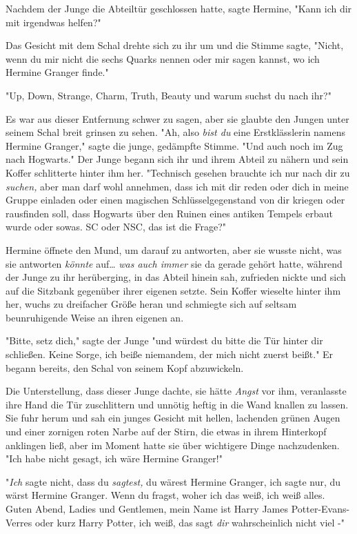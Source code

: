 {Nachdem der Junge die Abteiltür geschlossen hatte, sagte Hermine, "Kann ich dir mit irgendwas helfen?"

Das Gesicht mit dem Schal drehte sich zu ihr um und die Stimme sagte, "Nicht, wenn du mir nicht die sechs Quarks nennen oder mir sagen kannst, wo ich Hermine Granger finde."

"Up, Down, Strange, Charm, Truth, Beauty und warum suchst du nach ihr?"

Es war aus dieser Entfernung schwer zu sagen, aber sie glaubte den Jungen unter seinem Schal breit grinsen zu sehen. "Ah, also \emph{bist du} eine Erstklässlerin namens Hermine Granger," sagte die junge, gedämpfte Stimme. "Und auch noch im Zug nach Hogwarts." Der Junge begann sich ihr und ihrem Abteil zu nähern und sein Koffer schlitterte hinter ihm her. "Technisch gesehen brauchte ich nur nach dir zu \emph{suchen,} aber man darf wohl annehmen, dass ich mit dir reden oder dich in meine Gruppe einladen oder einen magischen Schlüsselgegenstand von dir kriegen oder rausfinden soll, dass Hogwarts über den Ruinen eines antiken Tempels erbaut wurde oder sowas. SC oder NSC, das ist die Frage?"

Hermine öffnete den Mund, um darauf zu antworten, aber sie wusste nicht, was sie antworten \emph{könnte} auf… \emph{was auch immer} sie da gerade gehört hatte, während der Junge zu ihr herüberging, in das Abteil hinein sah, zufrieden nickte und sich auf die Sitzbank gegenüber ihrer eigenen setzte. Sein Koffer wieselte hinter ihm her, wuchs zu dreifacher Größe heran und schmiegte sich auf seltsam beunruhigende Weise an ihren eigenen an.

"Bitte, setz dich," sagte der Junge "und würdest du bitte die Tür hinter dir schließen. Keine Sorge, ich beiße niemandem, der mich nicht zuerst beißt." Er begann bereits, den Schal von seinem Kopf abzuwickeln.

Die Unterstellung, dass dieser Junge dachte, sie hätte \emph{Angst} vor ihm, veranlasste ihre Hand die Tür zuschlittern und unnötig heftig in die Wand knallen zu lassen. Sie fuhr herum und sah ein junges Gesicht mit hellen, lachenden grünen Augen und einer zornigen roten Narbe auf der Stirn, die etwas in ihrem Hinterkopf anklingen ließ, aber im Moment hatte sie über wichtigere Dinge nachzudenken. "Ich habe nicht gesagt, ich wäre Hermine Granger!"

"\emph{Ich} sagte nicht, dass du \emph{sagtest,} du wärest Hermine Granger, ich sagte nur, du wärst Hermine Granger. Wenn du fragst, woher ich das weiß, ich weiß alles. Guten Abend, Ladies und Gentlemen, mein Name ist Harry James Potter-Evans-Verres oder kurz Harry Potter, ich weiß, das sagt \emph{dir} wahrscheinlich nicht viel -"

}
